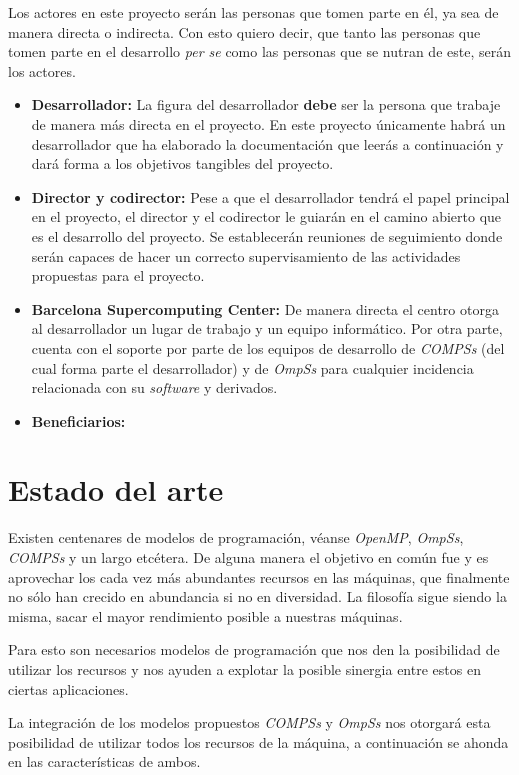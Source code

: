 \documentclass[a4paper]{article}
\begin{document}
Los actores en este proyecto serán las personas que tomen parte en él, ya sea de manera directa o indirecta. Con esto quiero decir, que tanto las personas que tomen parte en el desarrollo \textit{per se} como las personas que se nutran de este, serán los actores.

\begin{itemize}
 \item \textbf{Desarrollador:} La figura del desarrollador \textbf{debe} ser la persona que trabaje de manera más directa en el proyecto. En este proyecto únicamente habrá un desarrollador que ha elaborado la documentación que leerás a continuación y dará forma a los objetivos tangibles del proyecto.  
 \item \textbf{Director y codirector:} Pese a que el desarrollador tendrá el papel principal en el proyecto, el director y el codirector le guiarán en el camino abierto que es el desarrollo del proyecto. Se establecerán reuniones de seguimiento donde serán capaces de hacer un correcto supervisamiento de las actividades propuestas para el proyecto.
 \item \textbf{Barcelona Supercomputing Center:} De manera directa el centro otorga al desarrollador un lugar de trabajo y un equipo informático. Por otra parte, cuenta con el soporte por parte de los equipos de desarrollo de \textit{COMPSs} (del cual forma parte el desarrollador) y de \textit{OmpSs} para cualquier incidencia relacionada con su \textit{software} y derivados.
 \item \textbf{Beneficiarios:} %
 
\end{itemize}

\section{Estado del arte}

Existen centenares de modelos de programación, véanse \textit{OpenMP}, \textit{OmpSs}, \textit{COMPSs} y un largo etcétera. De alguna manera el objetivo en común fue y es aprovechar los cada vez más abundantes recursos en las máquinas, que finalmente no sólo han crecido en abundancia si no en diversidad. La filosofía sigue siendo la misma, sacar el mayor rendimiento posible a nuestras máquinas. \par\bigskip

Para esto son necesarios modelos de programación que nos den la posibilidad de utilizar los recursos y nos ayuden a explotar la posible sinergia entre estos en ciertas aplicaciones. 
\par\bigskip
La integración de los modelos propuestos \textit{COMPSs} y \textit{OmpSs} nos otorgará esta posibilidad de utilizar todos los recursos de la máquina, a continuación se ahonda en las características de ambos.
\end{document}
